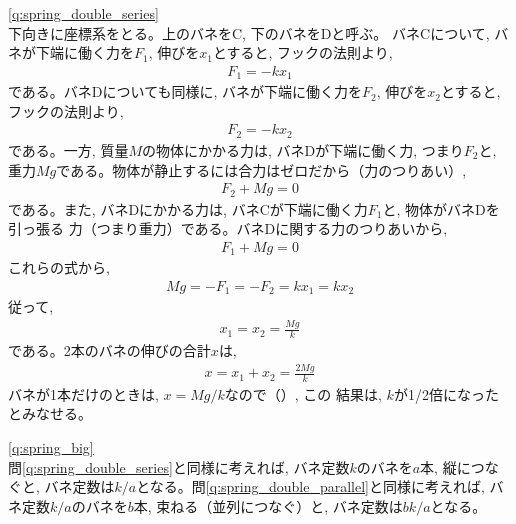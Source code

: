 \ref{q:spring_double_series}\\
下向きに座標系をとる。上のバネをC, 下のバネをDと呼ぶ。
バネCについて, バネが下端に働く力を$F_1$, 伸びを$x_1$とすると, フックの法則より, 
\begin{eqnarray}F_1=-kx_1\end{eqnarray}
である。バネDについても同様に, バネが下端に働く力を$F_2$, 伸びを$x_2$とすると, 
フックの法則より, 
\begin{eqnarray}F_2=-kx_2\end{eqnarray}
である。一方, 質量$M$の物体にかかる力は, バネDが下端に働く力, つまり$F_2$と, 
重力$Mg$である。物体が静止するには合力はゼロだから（力のつりあい）, 
\begin{eqnarray}F_2+Mg=0\end{eqnarray}
である。また, バネDにかかる力は, バネCが下端に働く力$F_1$と, 物体がバネDを引っ張る
力（つまり重力）である。バネDに関する力のつりあいから, 
\begin{eqnarray}F_1+Mg=0\end{eqnarray}
これらの式から, 
\begin{eqnarray}Mg=-F_1=-F_2=kx_1=kx_2\end{eqnarray}
従って, 
\begin{eqnarray}x_1=x_2=\frac{Mg}{k}\end{eqnarray}
である。2本のバネの伸びの合計$x$は, 
\begin{eqnarray}x=x_1+x_2=\frac{2Mg}{k}\end{eqnarray}
バネが1本だけのときは, $x=Mg/k$なので（）, この
結果は, $k$が1/2倍になったとみなせる。
\vspace{0.2cm}

\ref{q:spring_big}\\
問\ref{q:spring_double_series}と同様に考えれば, バネ定数$k$のバネを$a$本, 縦につなぐと, 
バネ定数は$k/a$となる。問\ref{q:spring_double_parallel}と同様に考えれば, バネ定数$k/a$のバネを$b$本, 
束ねる（並列につなぐ）と, バネ定数は$bk/a$となる。
\vspace{0.2cm}

